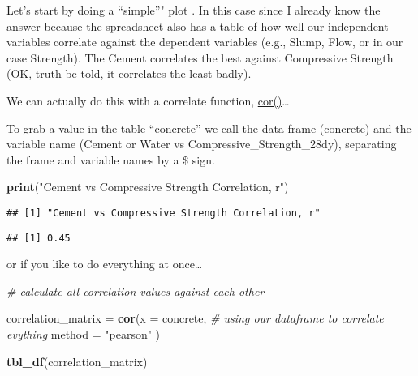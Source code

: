 \documentclass[]{article}
\newenvironment{Shaded}{\begin{snugshade}}{\end{snugshade}}
\newcommand{\CommentTok}[1]{\textcolor[rgb]{0.56,0.35,0.01}{\textit{#1}}}
\newcommand{\DataTypeTok}[1]{\textcolor[rgb]{0.13,0.29,0.53}{#1}}
\newcommand{\KeywordTok}[1]{\textcolor[rgb]{0.13,0.29,0.53}{\textbf{#1}}}
\newcommand{\NormalTok}[1]{#1}
\newcommand{\OperatorTok}[1]{\textcolor[rgb]{0.81,0.36,0.00}{\textbf{#1}}}
\newcommand{\StringTok}[1]{\textcolor[rgb]{0.31,0.60,0.02}{#1}}
\begin{document}
Let's start by doing a ``simple''" plot . In this case since I already
know the answer because the spreadsheet also has a table of how well our
independent variables correlate against the dependent variables (e.g.,
Slump, Flow, or in our case Strength). The Cement correlates the best
against Compressive Strength (OK, truth be told, it correlates the least
badly).

We can actually do this with a correlate function,
\href{https://www.rdocumentation.org/packages/stats/versions/3.4.3/topics/cor}{cor()}\ldots{}

To grab a value in the table ``concrete'' we call the data frame
(concrete) and the variable name (Cement or Water vs
Compressive\_Strength\_28dy), separating the frame and variable names by
a \$ sign.

\begin{Shaded}
\begin{Highlighting}[]
\KeywordTok{print}\NormalTok{(}\StringTok{"Cement vs Compressive Strength Correlation, r"}\NormalTok{)}
\end{Highlighting}
\end{Shaded}

\begin{verbatim}
## [1] "Cement vs Compressive Strength Correlation, r"
\end{verbatim}

\begin{Shaded}
\end{Shaded}

\begin{verbatim}
## [1] 0.45
\end{verbatim}

or if you like to do everything at once\ldots{}

\begin{Shaded}
\begin{Highlighting}[]
\CommentTok{# calculate all correlation values against each other}

\NormalTok{correlation_matrix =}\StringTok{ }\KeywordTok{cor}\NormalTok{(}\DataTypeTok{x      =}\NormalTok{ concrete, }\CommentTok{# using our dataframe to correlate evything}
                         \DataTypeTok{method =} \StringTok{"pearson"}\NormalTok{ )}

\KeywordTok{tbl_df}\NormalTok{(correlation_matrix)}
\end{Highlighting}
\end{Shaded}
\end{document}
